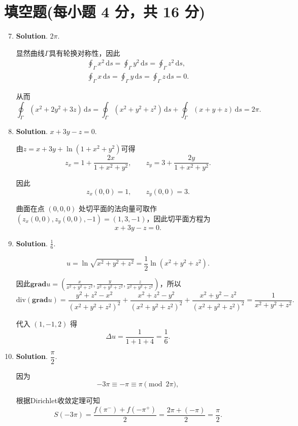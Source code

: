 \documentclass[../Main.tex]{subfiles}
\begin{document}
\section{填空题(每小题 4 分，共 16 分)}
\begin{enumerate}
  \setcounter{enumi}{6}
  \item \textbf{Solution}. $2\pi$.

        显然曲线$\Gamma$具有轮换对称性，因此
        \[
          \begin{gathered}
            \oint_\Gamma x^2\,\mathrm{d}s=\oint_\Gamma y^2\,\mathrm{d}s=\oint_\Gamma z^2\,\mathrm{d}s,\\
            \oint_\Gamma x\,\mathrm{d}s=\oint_\Gamma y\,\mathrm{d}s=\oint_\Gamma z\,\mathrm{d}s=0.
          \end{gathered}
        \]

        从而
        \[
          \oint_\Gamma(x^2+2y^2+3z)\,\mathrm{d}s=\oint_\Gamma(x^2+y^2+z^2)\,\mathrm{d}s+\oint_\Gamma(x+y+z)\,\mathrm{d}s=2\pi.
        \]

  \item \textbf{Solution}. $x+3y-z=0$.

        由$z=x+3y+\ln(1+x^2+y^2)$可得
        \[
          z_x=1+\frac{2x}{1+x^2+y^2},\qquad z_y=3+\frac{2y}{1+x^2+y^2}.
        \]

        因此
        \[
          z_x(0,0)=1,\qquad z_y(0,0)=3.
        \]

        曲面在点 \((0,0,0)\) 处切平面的法向量可取作$(z_x(0,0),z_y(0,0),-1)=(1,3,-1)$，因此切平面方程为
        \[
          x+3y-z=0.
        \]

  \item \textbf{Solution}. $\frac{1}{6}$.

        \[
          u=\ln\sqrt{x^2+y^2+z^2}=\frac12\ln(x^2+y^2+z^2).
        \]

        因此$\mathbf{grad}u=\left(\frac{x}{x^2+y^2+z^2},\frac{y}{x^2+y^2+z^2},\frac{z}{x^2+y^2+z^2}\right)$，所以
        \[
          \text{div}(\mathbf{grad}u)=\frac{y^2+z^2-x^2}{(x^2+y^2+z^2)^2}+\frac{x^2+z^2-y^2}{(x^2+y^2+z^2)^2}+\frac{x^2+y^2-z^2}{(x^2+y^2+z^2)^2}=\frac{1}{x^2+y^2+z^2}.
        \]

        代入 \((1,-1,2)\) 得
        \[
          \Delta u=\frac{1}{1+1+4}=\frac{1}{6}.
        \]

  \item \textbf{Solution}. $\dfrac{\pi}{2}$.

        因为
        \[
          -3\pi\equiv -\pi\equiv \pi \pmod{2\pi},
        \]

        根据Dirichlet收敛定理可知
        \[
          S(-3\pi)=\frac{f(\pi^-)+f(-\pi^+)}{2}
          =\frac{2\pi+(-\pi)}{2}
          =\frac{\pi}{2}.
        \]
\end{enumerate}
\end{document}
